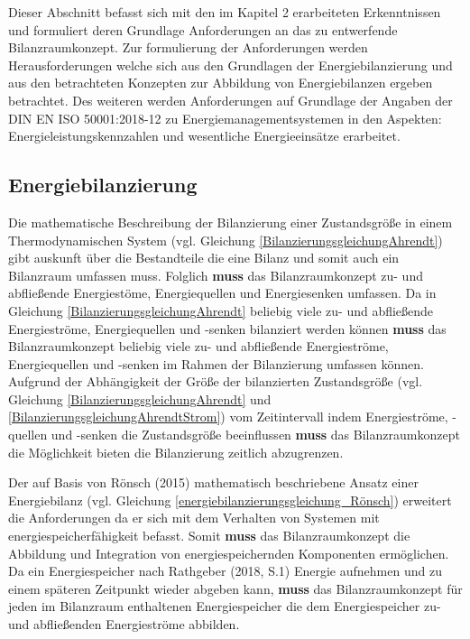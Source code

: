 Dieser Abschnitt befasst sich mit den im Kapitel 2 erarbeiteten Erkenntnissen und formuliert deren Grundlage Anforderungen an das zu entwerfende Bilanzraumkonzept.
Zur formulierung der Anforderungen werden Herausforderungen welche sich aus den Grundlagen der Energiebilanzierung und aus den betrachteten Konzepten zur Abbildung 
von Energiebilanzen ergeben betrachtet.
Des weiteren werden Anforderungen auf Grundlage der Angaben der DIN EN ISO 50001:2018-12 zu Energiemanagementsystemen in den Aspekten: 
Energieleistungskennzahlen und wesentliche Energieeinsätze erarbeitet.

\subsection{Energiebilanzierung}
Die mathematische Beschreibung der Bilanzierung einer Zustandsgröße in einem Thermodynamischen System (vgl. Gleichung \eqref{BilanzierungsgleichungAhrendt}) gibt auskunft 
über die Bestandteile die eine Bilanz und somit auch ein Bilanzraum umfassen muss. 
Folglich \textbf{muss} das Bilanzraumkonzept zu- und abfließende Energiestöme, Energiequellen und Energiesenken umfassen.
Da in Gleichung \eqref{BilanzierungsgleichungAhrendt} beliebig viele zu- und abfließende Energieströme, Energiequellen und -senken bilanziert werden können 
\textbf{muss} das Bilanzraumkonzept beliebig viele zu- und abfließende Energieströme, Energiequellen und -senken im Rahmen der Bilanzierung umfassen können.
Aufgrund der Abhängigkeit der Größe der bilanzierten Zustandsgröße (vgl. Gleichung \eqref{BilanzierungsgleichungAhrendt} und \eqref{BilanzierungsgleichungAhrendtStrom}) 
vom Zeitintervall indem Energieströme, -quellen und -senken die Zustandsgröße beeinflussen \textbf{muss} das Bilanzraumkonzept die Möglichkeit bieten die Bilanzierung 
zeitlich abzugrenzen.


Der auf Basis von Rönsch (2015) mathematisch beschriebene Ansatz einer Energiebilanz (vgl. Gleichung \eqref{energiebilanzierungsgleichung_Rönsch}) erweitert die Anforderungen 
da er sich mit dem Verhalten von Systemen mit energiespeicherfähigkeit befasst.
Somit \textbf{muss} das Bilanzraumkonzept die Abbildung und Integration von energiespeichernden Komponenten ermöglichen.
Da ein Energiespeicher nach Rathgeber (2018, S.1) Energie aufnehmen und zu einem späteren Zeitpunkt wieder abgeben kann, \textbf{muss} das Bilanzraumkonzept für jeden 
im Bilanzraum enthaltenen Energiespeicher die dem Energiespeicher zu- und abfließenden Energieströme abbilden.   


